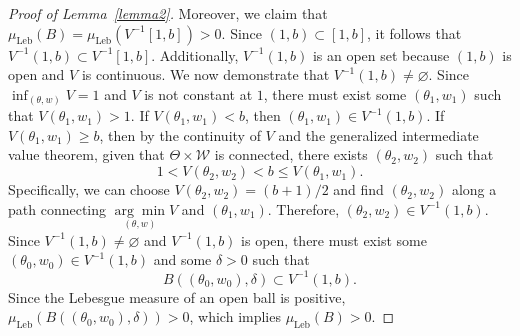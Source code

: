 \documentclass[pdflatex,sn-mathphys-num]{sn-jnl}
\renewcommand{\geq}{\geqslant}
\renewcommand{\leq}{\leqslant}
\theoremstyle{thmstyleone}
\theoremstyle{thmstyletwo}
\theoremstyle{thmstylethree}
\begin{document}
\begin{proof}[Proof of Lemma~\ref{lemma2}]
Moreover, we claim that $\mu_{\text{Leb}}(B) = \mu_{\text{Leb}}(V^{-1}[1,b]) > 0$. Since $(1,b) \subset [1,b]$, it follows that $V^{-1}(1,b) \subset V^{-1}[1,b]$. Additionally, $V^{-1}(1,b)$ is an open set because $(1,b)$ is open and $V$ is continuous. We now demonstrate that $V^{-1}(1,b) \neq\varnothing$. Since $\inf_{(\theta,w)} V = 1$ and $V$ is not constant at $1$, there must exist some $(\theta_1, w_1)$ such that $V(\theta_1, w_1) > 1$. If $V(\theta_1, w_1) < b$, then $(\theta_1, w_1) \in V^{-1}(1,b)$. If $V(\theta_1, w_1) \geq b$, then by the continuity of $V$ and the generalized intermediate value theorem, given that $\Theta \times \mathcal{W}$ is connected, there exists $(\theta_2, w_2)$ such that
  \[
  1 < V(\theta_2, w_2) < b \leq V(\theta_1, w_1).
  \]
  Specifically, we can choose $V(\theta_2, w_2) = (b+1)/2$ and find $(\theta_2, w_2)$ along a path connecting $\underset{(\theta,w)}{\arg \min }V$ and $(\theta_1, w_1)$. Therefore, $(\theta_2, w_2) \in V^{-1}(1,b)$. Since $V^{-1}(1,b) \neq\varnothing$ and $V^{-1}(1,b)$ is open, there must exist some $(\theta_0, w_0) \in V^{-1}(1,b)$ and some $\delta > 0$ such that
\[
B\left((\theta_0, w_0), \delta\right) \subset V^{-1}(1,b).
\]
Since the Lebesgue measure of an open ball is positive, $\mu_{\text{Leb}}\left(B\left((\theta_0, w_0), \delta\right)\right) > 0$, which implies $\mu_{\text{Leb}}(B) > 0$.
\end{proof}
\end{document}
